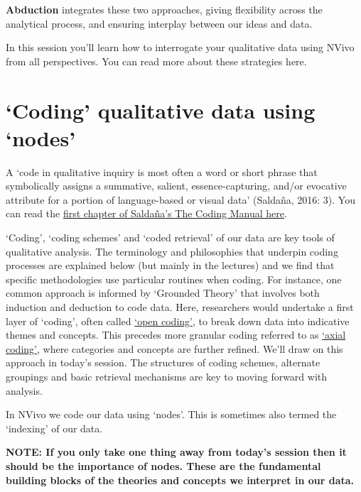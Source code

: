 \documentclass[]{book}
\theoremstyle{definition}
\theoremstyle{definition}
\theoremstyle{definition}
\theoremstyle{remark}
\begin{document}
\textbf{Abduction} integrates these two approaches, giving flexibility
across the analytical process, and ensuring interplay between our ideas
and data.

In this session you'll learn how to interrogate your qualitative data
using NVivo from all perspectives. You can read more about these
strategies here.

\hypertarget{coding-qualitative-data-using-nodes}{%
\section{`Coding' qualitative data using
`nodes'}\label{coding-qualitative-data-using-nodes}}

A `code in qualitative inquiry is most often a word or short phrase that
symbolically assigns a summative, salient, essence-capturing, and/or
evocative attribute for a portion of language-based or visual data'
(Saldaña, 2016: 3). You can read the
\href{http://stevescollection.weebly.com/uploads/1/3/8/6/13866629/saldana_2009_the-coding-manual-for-qualitative-researchers.pdf}{first
chapter of Saldaña's The Coding Manual here}.

`Coding', `coding schemes' and `coded retrieval' of our data are key
tools of qualitative analysis. The terminology and philosophies that
underpin coding processes are explained below (but mainly in the
lectures) and we find that specific methodologies use particular
routines when coding. For instance, one common approach is informed by
`Grounded Theory' that involves both induction and deduction to code
data. Here, researchers would undertake a first layer of `coding', often
called
\href{http://methods.sagepub.com/reference/sage-encyc-qualitative-research-methods/n299.xml}{`open
coding'}, to break down data into indicative themes and concepts. This
precedes more granular coding referred to as
\href{http://methods.sagepub.com/reference/encyc-of-case-study-research/n54.xml}{`axial
coding'}, where categories and concepts are further refined. We'll draw
on this approach in today's session. The structures of coding schemes,
alternate groupings and basic retrieval mechanisms are key to moving
forward with analysis.

In NVivo we code our data using `nodes'. This is sometimes also termed
the `indexing' of our data.

\textbf{NOTE: If you only take one thing away from today's session then
it should be the importance of nodes. These are the fundamental building
blocks of the theories and concepts we interpret in our data.}
\end{document}
